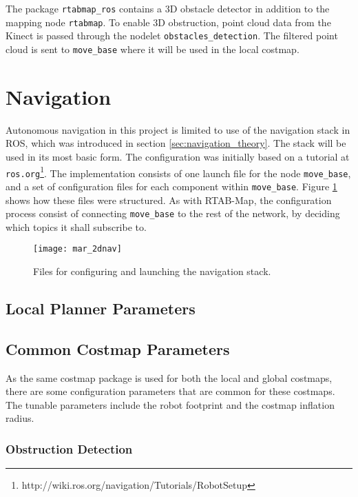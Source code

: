 The package \texttt{rtabmap\_ros} contains a 3D obstacle detector in addition to the mapping node \texttt{rtabmap}. To enable 3D obstruction, point cloud data from the Kinect is passed through the nodelet \texttt{obstacles\_detection}. The filtered point cloud is sent to \texttt{move\_base} where it will be used in the local costmap.

\section{Navigation}
\label{sec:navigation}
Autonomous navigation in this project is limited to use of the navigation stack in \ac{ROS}, which was introduced in section \ref{sec:navigation_theory}. The stack will be used in its most basic form. The configuration was initially based on a tutorial at \texttt{ros.org}\footnote{http://wiki.ros.org/navigation/Tutorials/RobotSetup}. The implementation consists of one launch file for the node \texttt{move\_base}, and a set of configuration files for each component within \texttt{move\_base}. Figure \ref{fig:mar_2dnav} shows how these files were structured. As with \ac{RTAB-Map}, the configuration process consist of connecting \texttt{move\_base} to the rest of the network, by deciding which topics it shall subscribe to. 

\begin{figure}[h]
	\centering
	\texttt{[image: mar\_2dnav]}
	\caption{Files for configuring and launching the navigation stack.}
	\label{fig:mar_2dnav}
\end{figure}

\subsection{Local Planner Parameters}

\subsection{Common Costmap Parameters}

As the same costmap package is used for both the local and global costmaps, there are some configuration parameters that are common for these costmaps. The tunable parameters include the robot footprint and the costmap inflation radius. 

\subsubsection{Obstruction Detection}


